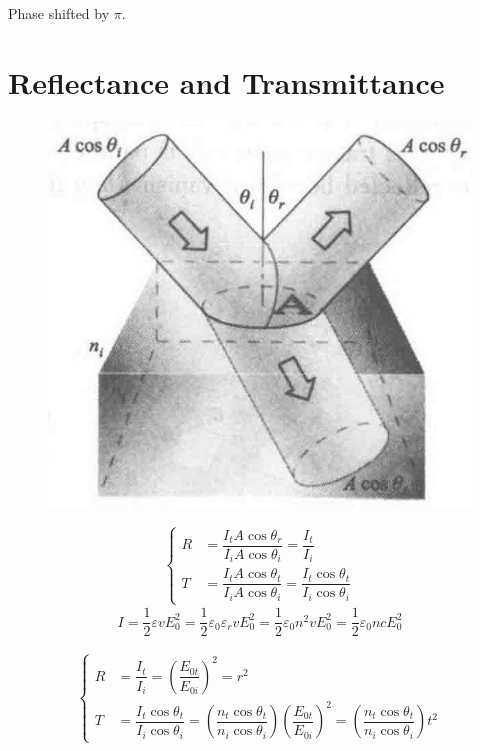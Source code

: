 Phase shifted by $\pi$.

\section{Reflectance and Transmittance}

\begin{figure}[H]
  \centering
  \includegraphics[width=0.4\linewidth]{figures/Reflectance-and-Transmittance}
  \label{fig:}
\end{figure}


\begin{equation*}
  \left\{
  \begin{aligned}
    R &= \dfrac{I_t A \cos \theta_r}{I_i A \cos \theta_i} = \dfrac{I_t}{I_i} \\
    T &= \dfrac{I_t A \cos \theta_t}{I_i A \cos \theta_i} = \dfrac{I_t \cos \theta_t}{I_i \cos \theta_i}
  \end{aligned}
  \right.
\end{equation*}
\begin{equation*}
  \begin{aligned}
    I = \dfrac{1}{2} \varepsilon v E_0^2 = \dfrac{1}{2} \varepsilon_0 \varepsilon_r v E_0^2 = \dfrac{1}{2} \varepsilon_0 n^2 v E_0^2 = \dfrac{1}{2} \varepsilon_0 n c E_0^2
  \end{aligned}
\end{equation*}

\begin{equation*}
  \left\{
  \begin{aligned}
    R &= \dfrac{I_t}{I_i} = \left( \dfrac{E_{0t}}{E_{0i}}  \right)^2 = r^2 \\
    T &= \dfrac{I_t \cos \theta_t}{I_i \cos \theta_i} = \left( \dfrac{n_t \cos \theta_t}{n_i \cos \theta_i}  \right) \left( \dfrac{E_{0t}}{E_{0i}}  \right)^2 = \left( \dfrac{n_t \cos \theta_t}{n_i \cos \theta_i}  \right) t^2
  \end{aligned}
  \right.
\end{equation*}

